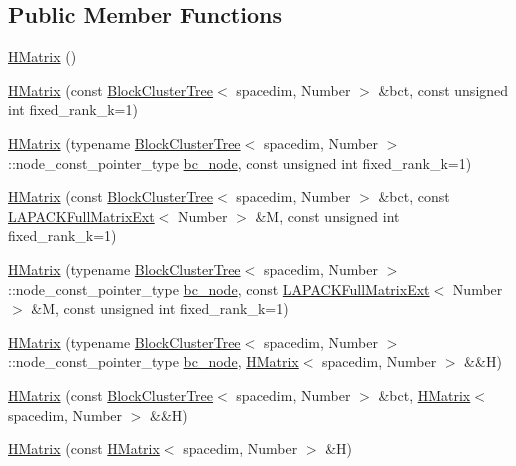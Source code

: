 \subsection*{Public Member Functions}
\begin{DoxyCompactItemize}
\item 
\hyperlink{classHMatrix_ae3dc35e1aefee2580d27ad2d65c906de}{H\+Matrix} ()
\item 
\hyperlink{classHMatrix_a6a4dead0321e8df38865bf6fbd0f6e81}{H\+Matrix} (const \hyperlink{classBlockClusterTree}{Block\+Cluster\+Tree}$<$ spacedim, Number $>$ \&bct, const unsigned int fixed\+\_\+rank\+\_\+k=1)
\item 
\hyperlink{classHMatrix_a4fe44a3aa2b813f593b787f24be56a1c}{H\+Matrix} (typename \hyperlink{classBlockClusterTree}{Block\+Cluster\+Tree}$<$ spacedim, Number $>$\+::node\+\_\+const\+\_\+pointer\+\_\+type \hyperlink{classHMatrix_a4a304494c970b5b267be1d8459d51586}{bc\+\_\+node}, const unsigned int fixed\+\_\+rank\+\_\+k=1)
\item 
\hyperlink{classHMatrix_a8e7d103ec4f093870f9e792e26d6b915}{H\+Matrix} (const \hyperlink{classBlockClusterTree}{Block\+Cluster\+Tree}$<$ spacedim, Number $>$ \&bct, const \hyperlink{classLAPACKFullMatrixExt}{L\+A\+P\+A\+C\+K\+Full\+Matrix\+Ext}$<$ Number $>$ \&M, const unsigned int fixed\+\_\+rank\+\_\+k=1)
\item 
\hyperlink{classHMatrix_abb59b3981e9f32f319479088d786989d}{H\+Matrix} (typename \hyperlink{classBlockClusterTree}{Block\+Cluster\+Tree}$<$ spacedim, Number $>$\+::node\+\_\+const\+\_\+pointer\+\_\+type \hyperlink{classHMatrix_a4a304494c970b5b267be1d8459d51586}{bc\+\_\+node}, const \hyperlink{classLAPACKFullMatrixExt}{L\+A\+P\+A\+C\+K\+Full\+Matrix\+Ext}$<$ Number $>$ \&M, const unsigned int fixed\+\_\+rank\+\_\+k=1)
\item 
\hyperlink{classHMatrix_abeb8d0add9bffecafc12f4c6b1dcab8e}{H\+Matrix} (typename \hyperlink{classBlockClusterTree}{Block\+Cluster\+Tree}$<$ spacedim, Number $>$\+::node\+\_\+const\+\_\+pointer\+\_\+type \hyperlink{classHMatrix_a4a304494c970b5b267be1d8459d51586}{bc\+\_\+node}, \hyperlink{classHMatrix}{H\+Matrix}$<$ spacedim, Number $>$ \&\&H)
\item 
\hyperlink{classHMatrix_a78aa967d7a99e27cc172f0db3791306b}{H\+Matrix} (const \hyperlink{classBlockClusterTree}{Block\+Cluster\+Tree}$<$ spacedim, Number $>$ \&bct, \hyperlink{classHMatrix}{H\+Matrix}$<$ spacedim, Number $>$ \&\&H)
\item 
\hyperlink{classHMatrix_a0b5227e35290f6c9fba1e8948e9a29c3}{H\+Matrix} (const \hyperlink{classHMatrix}{H\+Matrix}$<$ spacedim, Number $>$ \&H)

\end{DoxyCompactItemize}
